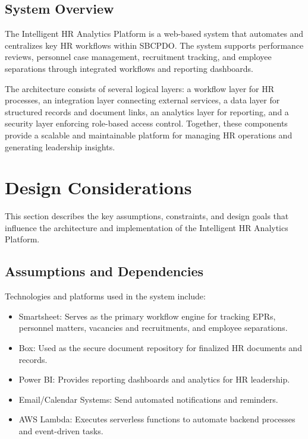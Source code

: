\documentclass[12pt]{article}
\def\textbf#1{#1}%
\begin{document}
\subsection{System Overview}

The Intelligent HR Analytics Platform is a web-based system that automates and centralizes key HR workflows within SBCPDO. The system supports performance reviews, personnel case management, recruitment tracking, and employee separations through integrated workflows and reporting dashboards.

The architecture consists of several logical layers: a workflow layer for HR processes, an integration layer connecting external services, a data layer for structured records and document links, an analytics layer for reporting, and a security layer enforcing role-based access control. Together, these components provide a scalable and maintainable platform for managing HR operations and generating leadership insights.


\section{Design Considerations}

This section describes the key assumptions, constraints, and design goals that influence the architecture and implementation of the Intelligent HR Analytics Platform.

\subsection{Assumptions and Dependencies}

Technologies and platforms used in the system include:

\begin{itemize}
    \item \textbf{Smartsheet}: Serves as the primary workflow engine for tracking EPRs, personnel matters, vacancies and recruitments, and employee separations.
    \item \textbf{Box}: Used as the secure document repository for finalized HR documents and records.
    \item \textbf{Power BI}: Provides reporting dashboards and analytics for HR leadership.
    \item \textbf{Email/Calendar Systems}: Send automated notifications and reminders.
    \item \textbf{AWS Lambda}: Executes serverless functions to automate backend processes and event-driven tasks.
\end{itemize}
\end{document}

